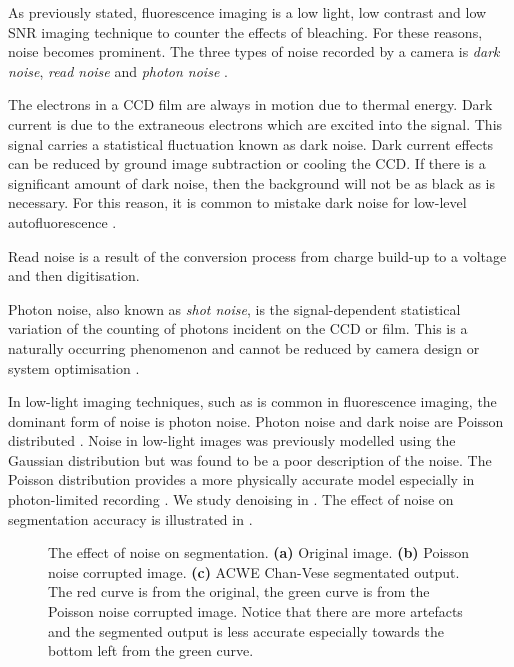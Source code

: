 \begin{definition}[Noise]
As previously stated, fluorescence imaging is a low light, low contrast and low SNR imaging technique to counter the effects of bleaching.
For these reasons, noise becomes prominent. The three types of noise recorded by a camera is \textit{dark noise}, \textit{read noise} and \textit{photon noise} \citep{Dobrucki2013,Danek2012,Matula2012,Hubeny2008}.

The electrons in a CCD film are always in motion due to thermal energy.
Dark current is due to the extraneous electrons which are excited into the signal.
This signal carries a statistical fluctuation known as dark noise.
Dark current effects can be reduced by ground image subtraction or cooling the CCD.
If there is a significant amount of dark noise, then the background will not be as black as is necessary.
For this reason, it is common to mistake dark noise for low-level autofluorescence \citep{Ryan2016,Dobrucki2013}.

Read noise is a result of the conversion process from charge build-up to a voltage and then digitisation.

Photon noise, also known as \textit{shot noise}, is the signal-dependent statistical variation of the counting of photons incident on the CCD or film.
This is a naturally occurring phenomenon and cannot be reduced by camera design or system optimisation \cite{Ryan2016}.

In low-light imaging techniques, such as is common in fluorescence imaging, the dominant form of noise is photon noise.
Photon noise and dark noise are Poisson distributed \citep{Danek2012,Ryan2016,Kempen1999}.
Noise in low-light images was previously modelled using the Gaussian distribution but was found to be a poor description of the noise.
The Poisson distribution provides a more physically accurate model especially in photon-limited recording \citep{Sarder2006}.
We study denoising in .
The effect of noise on segmentation accuracy is illustrated in .

\begin{figure}[!t]
	\centering
	\caption{The effect of noise on segmentation. 
		\textbf{(a)} Original image. 
		\textbf{(b)} Poisson noise corrupted image.
		\textbf{(c)} ACWE Chan-Vese segmentated output. The red curve is from the original, the green curve is from the Poisson noise corrupted image. Notice that there are more artefacts and the segmented output is less accurate especially towards the bottom left from the green curve.}
	\label{fig:Noise}
\end{figure}
\end{definition}

